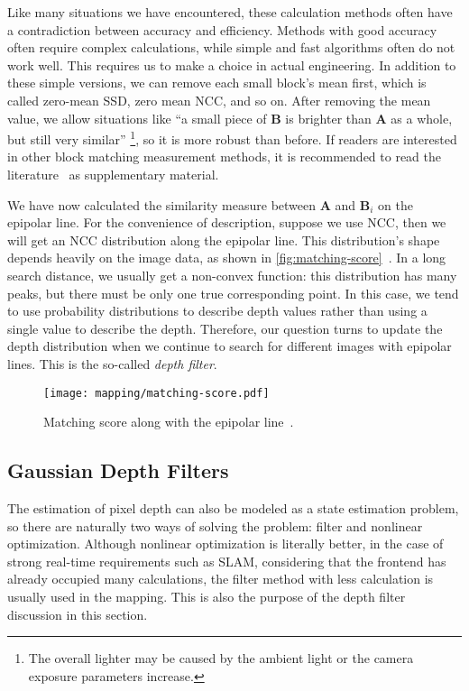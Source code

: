 Like many situations we have encountered, these calculation methods often have a contradiction between accuracy and efficiency. Methods with good accuracy often require complex calculations, while simple and fast algorithms often do not work well. This requires us to make a choice in actual engineering. In addition to these simple versions, we can remove each small block's mean first, which is called zero-mean SSD, zero mean NCC, and so on. After removing the mean value, we allow situations like ``a small piece of $\mathbf{B}$ is brighter than $\mathbf{A}$ as a whole, but still very similar'' \footnote{The overall lighter may be caused by the ambient light or the camera exposure parameters increase. }, so it is more robust than before. If readers are interested in other block matching measurement methods, it is recommended to read the literature~\cite{stereo-matching-website, Hirschmuller2007} as supplementary material.

We have now calculated the similarity measure between $\mathbf{A}$ and $\mathbf{B}_i$ on the epipolar line. For the convenience of description, suppose we use NCC, then we will get an NCC distribution along the epipolar line. This distribution's shape depends heavily on the image data, as shown in \autoref{fig:matching-score}~. In a long search distance, we usually get a non-convex function: this distribution has many peaks, but there must be only one true corresponding point. In this case, we tend to use probability distributions to describe depth values rather than using a single value to describe the depth. Therefore, our question turns to update the depth distribution when we continue to search for different images with epipolar lines. This is the so-called \textit{depth filter}.

\begin{figure}[!htp]
	\centering
	\texttt{[image: mapping/matching-score.pdf]}
	\caption{Matching score along with the epipolar line~\cite{Vogiatzis2011}.}
	\label{fig:matching-score}
\end{figure}

\subsection{Gaussian Depth Filters}
The estimation of pixel depth can also be modeled as a state estimation problem, so there are naturally two ways of solving the problem: filter and nonlinear optimization. Although nonlinear optimization is literally better, in the case of strong real-time requirements such as SLAM, considering that the frontend has already occupied many calculations, the filter method with less calculation is usually used in the mapping. This is also the purpose of the depth filter discussion in this section.

